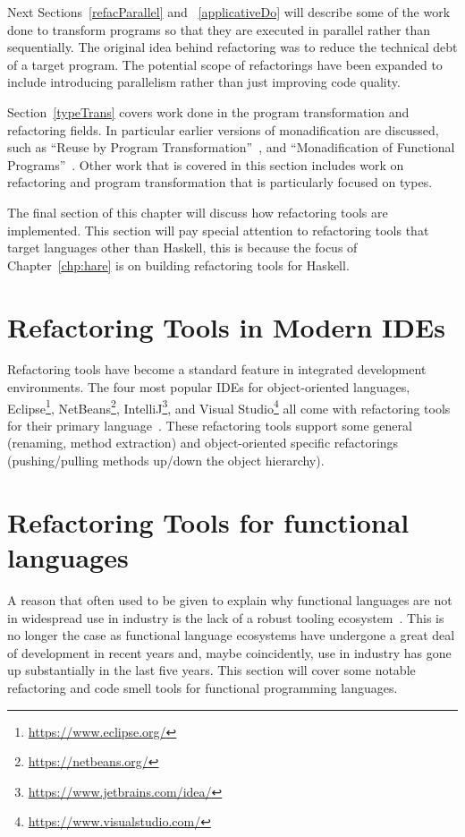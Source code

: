 Next Sections~\ref{refacParallel} and ~\ref{applicativeDo} will describe some of the work done to transform programs so that they are executed in parallel rather than sequentially. The original idea behind refactoring was to reduce the technical debt of a target program. The potential scope of refactorings have been expanded to include introducing parallelism rather than just improving code quality. 

Section~\ref{typeTrans} covers work done in the program transformation and refactoring fields. In particular earlier versions of monadification are discussed, such as ``Reuse by Program Transformation''~\citep{lammelReuse}, and ``Monadification of Functional Programs''~\citep{monadification}. Other work that is covered in this section includes work on refactoring and program transformation that is particularly focused on types.

The final section of this chapter will discuss how refactoring tools are implemented. This section will pay special attention to refactoring tools that target languages other than Haskell, this is because the focus of Chapter~\ref{chp:hare} is on building refactoring tools for Haskell.

\section{Refactoring Tools in Modern IDEs}\label{ideTools}
Refactoring tools have become a standard feature in integrated development environments. The four most popular IDEs for object-oriented languages, Eclipse\footnote{\url{https://www.eclipse.org/}}, NetBeans\footnote{\url{https://netbeans.org/}}, IntelliJ\footnote{\url{https://www.jetbrains.com/idea/}}, and Visual Studio\footnote{\url{https://www.visualstudio.com/}} all come with refactoring tools for their primary language~\citep{ides}. These refactoring tools support some general (renaming, method extraction) and object-oriented specific refactorings (pushing/pulling methods up/down the object hierarchy). 

\section{Refactoring Tools for functional languages}\label{funcTools}
A reason that often used to be given to explain why functional languages are not in widespread use in industry is the lack of a robust tooling ecosystem~\citep{wadlerTools}. This is no longer the case as functional language ecosystems have undergone a great deal of development in recent years and, maybe coincidently, use in industry has gone up substantially in the last five years. This section will cover some notable refactoring and code smell tools for functional programming languages.

